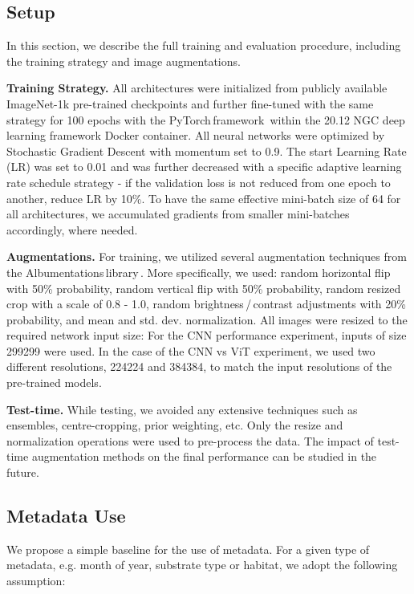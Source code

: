 \documentclass[10pt,twocolumn,letterpaper]{article}
\begin{document}
\subsection{Setup}
\label{setup}

In this section, we describe the full training and evaluation procedure, including the training strategy and image augmentations.

\textbf{Training Strategy.} All architectures were initialized from publicly available ImageNet-1k pre-trained checkpoints and further fine-tuned with the same strategy for 100 epochs with the PyTorch\,framework\,\cite{PyTorch} within the 20.12 NGC deep learning framework Docker container. All neural networks were optimized by Stochastic Gradient Descent with momentum set to 0.9. The start Learning Rate (LR) was set to 0.01 and was further decreased with a specific adaptive learning rate schedule strategy - if the validation loss is not reduced from one epoch to another, reduce LR by 10\%. To have the same effective mini-batch size of 64 for all architectures, we accumulated gradients from smaller mini-batches accordingly, where needed.

\textbf{Augmentations.} For training, we utilized several augmentation techniques from the Albumentations\,library\,\cite{albumentation}. More specifically, we used: random horizontal flip with 50\% probability, random vertical flip with 50\% probability, random resized crop with a scale of 0.8 - 1.0, random brightness\,/\,contrast adjustments with 20\% probability, and mean and std. dev. normalization. All images were resized to the required network input size: For the CNN performance experiment, inputs of size 299299 were used. In the case of the CNN vs ViT experiment, we used two different resolutions, 224224 and 384384, to match the input resolutions of the pre-trained models.

\textbf{Test-time.} While testing, we avoided any extensive techniques such as ensembles, centre-cropping, prior weighting, etc. Only the resize and normalization operations were used to pre-process the data. The impact of test-time augmentation methods on the final performance can be studied in the future.

\subsection{Metadata Use}
\label{metadata_usage}
We propose a simple baseline for the use of metadata.
For a given type of metadata, e.g. month of year, substrate type or habitat, we adopt the following assumption:
\end{document}
